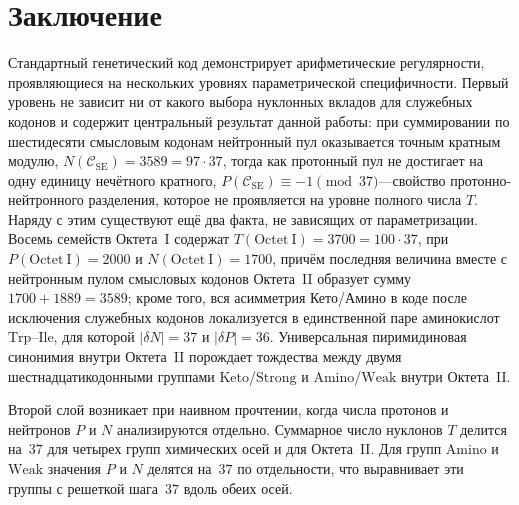 \documentclass[11pt,a4paper]{article}
\renewcommand{\_}{\origunderscore\allowbreak}
\begin{document}
\section{Заключение}
\label{sec:conclusion}

Стандартный генетический код демонстрирует арифметические регулярности, проявляющиеся на нескольких уровнях параметрической специфичности. Первый уровень не зависит ни от какого выбора нуклонных вкладов для служебных кодонов и содержит центральный результат данной работы: при суммировании по шестидесяти смысловым кодонам нейтронный пул оказывается точным кратным модулю, $N(\mathcal{C}_{\mathrm{SE}}) = 3589 = 97 \cdot 37$, тогда как протонный пул не достигает на одну единицу нечётного кратного, $P(\mathcal{C}_{\mathrm{SE}}) \equiv -1 \pmod{37}$---свойство протонно-нейтронного разделения, которое не проявляется на уровне полного числа $T$. Наряду с этим существуют ещё два факта, не зависящих от параметризации. Восемь семейств Октета~I содержат $T(\mathrm{Octet~I}) = 3700 = 100 \cdot 37$, при $P(\mathrm{Octet~I}) = 2000$ и $N(\mathrm{Octet~I}) = 1700$, причём последняя величина вместе с нейтронным пулом смысловых кодонов Октета~II образует сумму $1700 + 1889 = 3589$; кроме того, вся асимметрия Кето/Амино в коде после исключения служебных кодонов локализуется в единственной паре аминокислот $\mathrm{Trp}$--$\mathrm{Ile}$, для которой $|\delta N| = 37$ и $|\delta P| = 36$. Универсальная пиримидиновая синонимия внутри Октета~II порождает тождества между двумя шестнадцатикодонными группами $\mathrm{Keto}$/$\mathrm{Strong}$ и $\mathrm{Amino}$/$\mathrm{Weak}$ внутри Октета~II.

Второй слой возникает при наивном прочтении, когда числа протонов и нейтронов
$P$ и $N$ анализируются отдельно. Суммарное число нуклонов
$T$ делится на~$37$ для четырех
групп химических осей и для Октета~II.
Для групп $\mathrm{Amino}$ и $\mathrm{Weak}$
значения $P$ и $N$ делятся на~$37$ по отдельности,
что выравнивает эти группы с решеткой шага~$37$
вдоль обеих осей.
\end{document}
